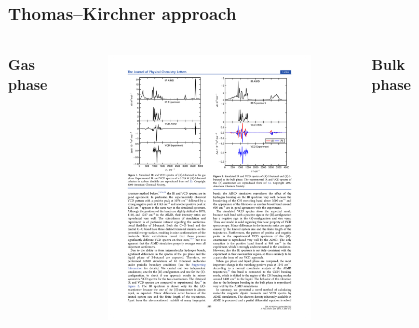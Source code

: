 \documentclass[t]{beamer}
\begin{document}
\begin{frame}
	\frametitle{Thomas--Kirchner approach}
	\vspace{-.25cm}
	\begin{columns}
		\centering
		\textbf{Gas phase}
		\vspace{-.25cm}
		\begin{figure}
			\includegraphics[width=.95\textwidth]{figures/butanol_gas_vcd.pdf}
		\end{figure}
		\centering
		\textbf{Bulk phase}
		\vspace{-.25cm}
		\begin{figure}

\end{figure}
\end{columns}
\end{frame}
\end{document}
